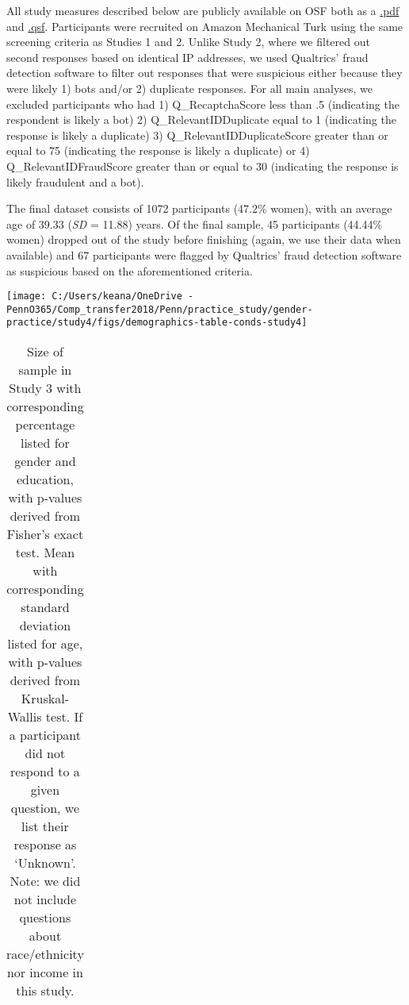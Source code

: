 \documentclass[letterpaper, nobind]{templates/ociamthesis}
\begin{document}
All study measures described below are publicly available on OSF both as a \href{https://osf.io/yfd2j/}{.pdf} and \href{https://osf.io/vhzy5/}{.qsf}. Participants were recruited on Amazon Mechanical Turk using the same screening criteria as Studies 1 and 2. Unlike Study 2, where we filtered out second responses based on identical IP addresses, we used Qualtrics' fraud detection software to filter out responses that were suspicious either because they were likely 1) bots and/or 2) duplicate responses. For all main analyses, we excluded participants who had 1) Q\_RecaptchaScore less than .5 (indicating the respondent is likely a bot) 2) Q\_RelevantIDDuplicate equal to 1 (indicating the response is likely a duplicate) 3) Q\_RelevantIDDuplicateScore greater than or equal to 75 (indicating the response is likely a duplicate) or 4) Q\_RelevantIDFraudScore greater than or equal to 30 (indicating the response is likely fraudulent and a bot).

The final dataset consists of 1072 participants (47.2\% women), with an average age of 39.33 (\emph{SD} = 11.88) years. Of the final sample, 45 participants (44.44\% women) dropped out of the study before finishing (again, we use their data when available) and 67 participants were flagged by Qualtrics' fraud detection software as suspicious based on the aforementioned criteria.

\newpage

\begin{center}\texttt{[image: C:/Users/keana/OneDrive - PennO365/Comp\_transfer2018/Penn/practice\_study/gender-practice/study4/figs/demographics-table-conds-study4]} \end{center}

\begin{table}[ht]
\centering
\begingroup\fontsize{0.1pt}{0.1pt}\selectfont
\begin{tabular}{r}
   \\ 
 \end{tabular}
\endgroup
\caption{Size of sample in Study 3 with corresponding percentage listed for gender and education, with p-values derived from Fisher’s exact test. Mean with corresponding standard deviation listed for age, with p-values derived from Kruskal-Wallis test. If a participant did not respond to a given question, we list their response as ‘Unknown’. Note: we did not include questions about race/ethnicity nor income in this study.} 
\label{tab:demographics-table-study4}
\end{table}
\end{document}
